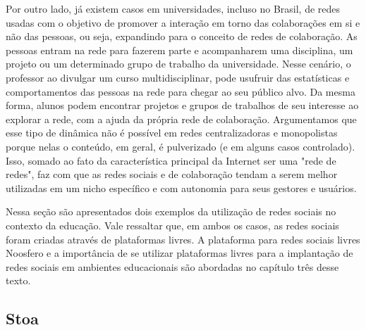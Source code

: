 Por outro lado, já existem casos em universidades, incluso no Brasil, de redes 
usadas com o objetivo de promover a interação em torno das colaborações em si e
não das pessoas, ou seja, expandindo para o conceito de redes de colaboração. As
pessoas entram na rede para fazerem parte e acompanharem uma disciplina, um projeto
ou um determinado grupo de trabalho da universidade. Nesse cenário, o professor
ao divulgar um curso multidisciplinar, pode usufruir das estatísticas e
comportamentos das pessoas na rede para chegar ao seu público alvo. Da mesma
forma, alunos podem encontrar projetos e grupos de trabalhos de seu interesse ao
explorar a rede, com a ajuda da própria rede de colaboração. Argumentamos que
esse tipo de dinâmica não é possível em redes centralizadoras e monopolistas
porque nelas o conteúdo, em geral, é pulverizado (e em alguns casos controlado).
Isso, somado ao fato da característica principal da Internet ser uma "rede de redes",
faz com que as redes sociais e de colaboração tendam a serem melhor utilizadas
em um nicho específico e com autonomia para seus gestores e usuários.

Nessa seção são apresentados dois exemplos da utilização de redes sociais no
contexto da educação. Vale ressaltar que, em ambos os casos, as redes sociais
foram criadas através de plataformas livres. A plataforma para redes sociais livres
Noosfero e a importância de se utilizar plataformas livres para a implantação de
redes sociais em ambientes educacionais são abordadas no capítulo três desse texto.

\subsection{Stoa}

